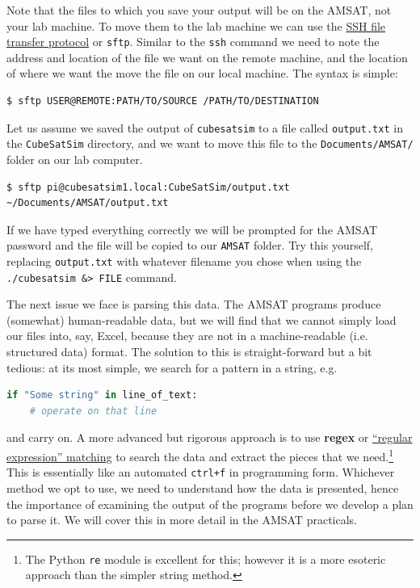 \documentclass{tufte-book}
\begin{document}


Note that the files to which you save your output will be on the AMSAT, not your lab machine. To move them to the lab machine we can use the \href{https://www.ssh.com/academy/ssh/sftp-ssh-file-transfer-protocol}{SSH file transfer protocol} or \verb|sftp|. Similar to the \verb|ssh| command we need to note the address and location of the file we want on the remote machine, and the location of where we want the move the file on our local machine. The syntax is simple:
\begin{lstlisting}[backgroundcolor=\color{lightgray}, breaklines=true]
$ sftp USER@REMOTE:PATH/TO/SOURCE /PATH/TO/DESTINATION
\end{lstlisting}
Let us assume we saved the output of \verb|cubesatsim| to a file called \verb|output.txt| in the \verb|CubeSatSim| directory, and we want to move this file to the \verb|Documents/AMSAT/| folder on our lab computer.
\begin{lstlisting}[backgroundcolor=\color{lightgray}, breaklines=true]
$ sftp pi@cubesatsim1.local:CubeSatSim/output.txt ~/Documents/AMSAT/output.txt
\end{lstlisting}
If we have typed everything correctly we will be prompted for the AMSAT password and the file will be copied to our \verb|AMSAT| folder. Try this yourself, replacing \verb|output.txt| with whatever filename you chose when using the \verb|./cubesatsim &> FILE| command.

The next issue we face is parsing this data. The AMSAT programs produce (somewhat) human-readable data, but we will find that we cannot simply load our files into, say, Excel, because they are not in a machine-readable (i.e. structured data) format. The solution to this is straight-forward but a bit tedious: at its most simple, we search for a pattern in a string, e.g. 
\begin{lstlisting}[backgroundcolor=\color{lightgray}, breaklines=true, language=Python, showstringspaces=false]
if "Some string" in line_of_text:
    # operate on that line
\end{lstlisting}

\noindent and carry on. A more advanced but rigorous approach is to use 
\textbf{regex} or \href{https://www.gnu.org/software/gnulib/manual/html_node/Regular-expressions.html}{``regular expression'' matching} to search the data and extract the pieces that we need.\footnote{The Python \texttt{re} module is excellent for this; however it is a more esoteric approach than the simpler string method.} This is essentially like an automated \verb|ctrl+f| in programming form. Whichever method we opt to use, we need to understand how the data is presented, hence the importance of examining the output of the programs before we develop a plan to parse it. We will cover this in more detail in the AMSAT practicals.
\end{document}
